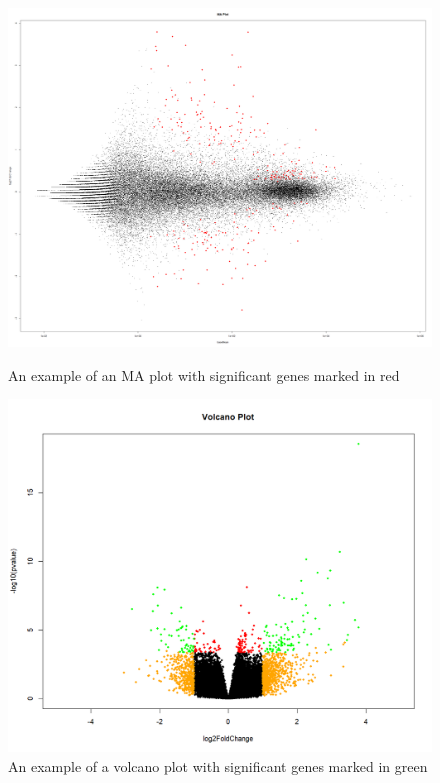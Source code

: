 \documentclass[11pt]{article}
\begin{document}
\begin{figure}
    \centering
    \begin{minipage}{0.45\textwidth}
        \centering
        \includegraphics[width=1\textwidth]{maplot.png} %
        \caption{An example of an MA plot with significant genes marked in red}
    \end{minipage}\hfill
    \begin{minipage}{0.45\textwidth}
        \centering
        \includegraphics[width=1\textwidth]{volcano.png} %
        \caption{An example of a volcano plot with significant genes marked in green}
    \end{minipage}
\end{figure}
\end{document}
